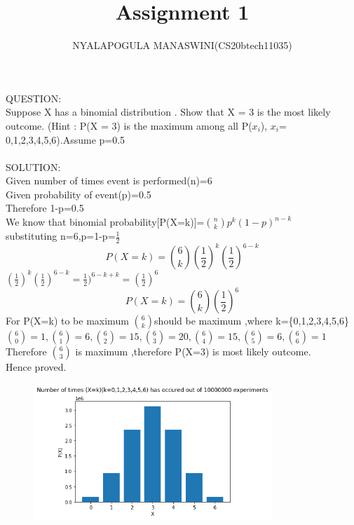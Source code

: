 \documentclass{assignment}
\begin{document}
\title{Assignment 1}
\author{NYALAPOGULA MANASWINI(CS20btech11035)}
\maketitle
\begin{Large}
QUESTION:\\
Suppose X has a binomial distribution . Show
that X = 3 is the most likely outcome.
(Hint : P(X = 3) is the maximum among all
P($x_i$), $x_i$= 0,1,2,3,4,5,6).Assume p=0.5\\
\\
SOLUTION:\\
Given number of times event is performed(n)=6\\
Given probability of event(p)=0.5\\
Therefore 1-p=0.5\\
We know that binomial probability[P(X=k)]=$\binom{n}{k}p^k({1-p})^{n-k}$\\
substituting n=6,p=1-p=$\frac{1}{2}$\\
\begin{equation}
P(X=k)=\binom{6}{k}(\frac{1}{2})^k(\frac{1}{2})^{6-k}
\end{equation}
$(\frac{1}{2})^k(\frac{1}{2})^{6-k}=\frac{1}{2})^{6-k+k}=(\frac{1}{2})^6$
\begin{equation}
P(X=k)=\binom{6}{k}(\frac{1}{2})^6
\end{equation}
For P(X=k) to be maximum $\binom{6}{k}$should be maximum ,where k=\{0,1,2,3,4,5,6\}
$\binom{6}{0}=1  , \binom{6}{1}=6,\binom{6}{2}=15,\binom{6}{3}=20,\binom{6}{4}=15,\binom{6}{5}=6,\binom{6}{6}=1$\\
Therefore $\binom{6}{3}$ is maximum ,therefore P(X=3) is most likely outcome.\\
Hence proved.
\begin{figure}
\begin{center}
\includegraphics[width=0.8\textwidth]{assignment1.png}
\end{center}
\end{figure}
\end{Large}
\end{document}
